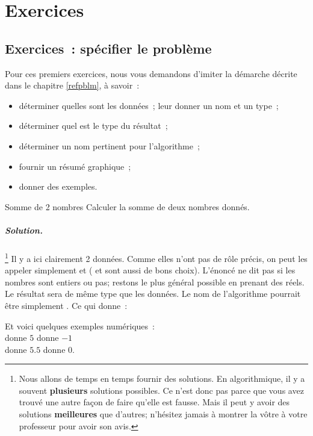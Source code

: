 \chapter{Exercices}

\minitoc

\clearpage
\section{Exercices~: spécifier le problème}

Pour ces premiers exercices, nous vous demandons d’imiter la démarche décrite
dans le chapitre \ref{refpblm}, à savoir~:

\begin{itemize}
	\item déterminer quelles sont les données~;
		leur donner un nom et un type~;
	\item déterminer quel est le type du résultat~;
	\item déterminer un nom pertinent pour l’algorithme~;
	\item fournir un résumé graphique~;
	\item donner des exemples.
\end{itemize}

\begin{Exercice}{Somme de 2 nombres}
	Calculer la somme de deux nombres donnés.
	\paragraph{Solution.}%
	\footnote{%
		Nous allons de temps en temps 
		fournir des solutions.
		En algorithmique,
		il y a souvent \textbf{plusieurs} solutions possibles.
		Ce n’est donc pas parce que vous avez trouvé une autre façon de faire qu'elle est fausse.
		Mais il peut y avoir des solutions \textbf{meilleures}
		que d’autres; 
		n’hésitez jamais à montrer la vôtre
		à votre professeur pour avoir son avis.
	}
	Il y a ici clairement 2 données.
	Comme elles n’ont pas de rôle précis,
	on peut les appeler simplement 
	et 
	( et  sont aussi de bons choix).
	L’énoncé ne dit pas si les nombres sont entiers ou pas;
	restons le plus général possible en prenant des réels.
	Le résultat sera de même type que les données.
	Le nom de l’algorithme pourrait être simplement .
	Ce qui donne~:
	\begin{center}
	\end{center}			 
	Et voici quelques exemples numériques~:	\\
	 donne $5$      \quad
	 donne $-1$    \\
	 donne $5.5$  \quad
	 donne $0$.
\end{Exercice}

